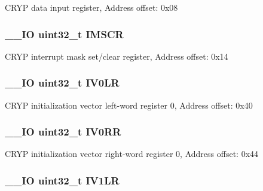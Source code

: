 C\-R\-Y\-P data input register, Address offset\-: 0x08 \hypertarget{struct_c_r_y_p___type_def_adcdd7c23a99f81c21dae2e9f989632e1}{
\subsubsection[{I\-M\-S\-C\-R}]{\setlength{\rightskip}{0pt plus 5cm}\-\_\-\-\_\-\-I\-O uint32\-\_\-t I\-M\-S\-C\-R}}\label{struct_c_r_y_p___type_def_adcdd7c23a99f81c21dae2e9f989632e1}
C\-R\-Y\-P interrupt mask set/clear register, Address offset\-: 0x14 \hypertarget{struct_c_r_y_p___type_def_ab1efba4cdf22c525fce804375961d567}{
\subsubsection[{I\-V0\-L\-R}]{\setlength{\rightskip}{0pt plus 5cm}\-\_\-\-\_\-\-I\-O uint32\-\_\-t I\-V0\-L\-R}}\label{struct_c_r_y_p___type_def_ab1efba4cdf22c525fce804375961d567}
C\-R\-Y\-P initialization vector left-\/word register 0, Address offset\-: 0x40 \hypertarget{struct_c_r_y_p___type_def_aeb1990f7c28e815a4962db3a861937bb}{
\subsubsection[{I\-V0\-R\-R}]{\setlength{\rightskip}{0pt plus 5cm}\-\_\-\-\_\-\-I\-O uint32\-\_\-t I\-V0\-R\-R}}\label{struct_c_r_y_p___type_def_aeb1990f7c28e815a4962db3a861937bb}
C\-R\-Y\-P initialization vector right-\/word register 0, Address offset\-: 0x44 \hypertarget{struct_c_r_y_p___type_def_aad2f43335b25a0065f3d327364610cbd}{
\subsubsection[{I\-V1\-L\-R}]{\setlength{\rightskip}{0pt plus 5cm}\-\_\-\-\_\-\-I\-O uint32\-\_\-t I\-V1\-L\-R}}\label{struct_c_r_y_p___type_def_aad2f43335b25a0065f3d327364610cbd}
